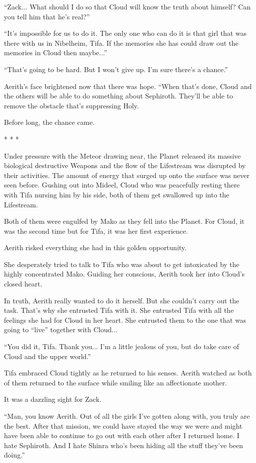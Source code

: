 \documentclass[oneside]{book}
\begin{document}
“Zack... What should I do so that Cloud will know the truth about himself? Can you tell him that he's real?”

“It's impossible for us to do it. The only one who can do it is that girl that was there with us in Nibelheim, Tifa. If the memories she has could draw out the memories in Cloud then maybe...”

“That's going to be hard. But I won't give up. I'm sure there's a chance.”

Aerith's face brightened now that there was hope. “When that's done, Cloud and the others will be able to do something about Sephiroth. They'll be able to remove the obstacle that's suppressing Holy.

Before long, the chance came.

* * *

Under pressure with the Meteor drawing near, the Planet released its massive biological destructive Weapons and the flow of the Lifestream was disrupted by their activities. The amount of energy that surged up onto the surface was never seen before. Gushing out into Mideel, Cloud who was peacefully resting there with Tifa nursing him by his side, both of them get swallowed up into the Lifestream.

Both of them were engulfed by Mako as they fell into the Planet. For Cloud, it was the second time but for Tifa, it was her first experience.

Aerith risked everything she had in this golden opportunity.

She desperately tried to talk to Tifa who was about to get intoxicated by the highly concentrated Mako. Guiding her conscious, Aerith took her into Cloud's closed heart.

In truth, Aerith really wanted to do it herself. But she couldn't carry out the task. That's why she entrusted Tifa with it. She entrusted Tifa with all the feelings she had for Cloud in her heart. She entrusted them to the one that was going to “live” together with Cloud...

“You did it, Tifa. Thank you... I'm a little jealous of you, but do take care of Cloud and the upper world.”

Tifa embraced Cloud tightly as he returned to his senses. Aerith watched as both of them returned to the surface while smiling like an affectionate mother.

It was a dazzling sight for Zack.

“Man, you know Aerith. Out of all the girls I've gotten along with, you truly are the best. After that mission, we could have stayed the way we were and might have been able to continue to go out with each other after I returned home. I hate Sephiroth. And I hate Shinra who's been hiding all the stuff they've been doing.”
\end{document}
